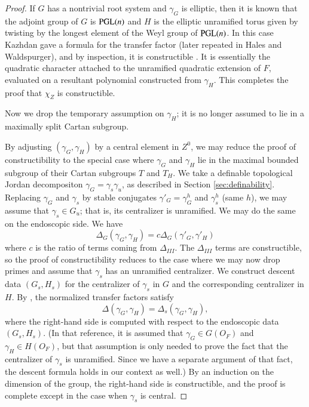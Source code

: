 \begin{proof}

If $G$ has a nontrivial root system and $\gamma_G$ is elliptic, then
it is known that the adjoint group of $G$ is ${\operatorname{PGL}}(n)$ and $H$ is
the elliptic unramified torus given by twisting by the longest element
of the Weyl group of ${\operatorname{PGL}}(n)$.  In this case Kazhdan gave a
formula for the transfer factor (later repeated in Hales and
Waldspurger), and by inspection, it is constructible
\cite{kazhdan1983lifting}.  It is essentially the quadratic character
attached to the unramified quadratic extension of $F$, evaluated on a
resultant polynomial constructed from $\gamma_H$.  This completes the
proof that $\chi_Z$ is constructible.

Now we drop the temporary assumption on $\gamma_H$; it is no longer
assumed to lie in a maximally split Cartan subgroup.

By adjusting $(\gamma_G,\gamma_H)$ by a central element in $Z^0$, we may reduce
the proof of constructibility to the special case where $\gamma_G$ and
$\gamma_H$ lie in the maximal bounded subgroup of their Cartan
subgroups $T$ and $T_H$.  We take a definable topological Jordan
decompositon $\gamma_G = \gamma_s \gamma_u$, as described in Section
\ref{sec:definability}.  Replacing $\gamma_G$ and $\gamma_s$ by stable
conjugates $\gamma'_G=\gamma_G^h$ and $\gamma_s^h$ (same $h$), we may
assume that $\gamma_s\in G_u$; that is, its centralizer is unramified.
We may do the same on the endoscopic side.  We have
\[
\Delta_G(\gamma_G,\gamma_H) = c \Delta_G(\gamma'_G,\gamma'_H)
\]
where $c$ is the ratio of terms coming from $\Delta_{III}$.  The
$\Delta_{III}$ terms are constructible, so the proof of
constructibility reduces to the case where we may now drop primes and
assume that $\gamma_s$ has an unramified centralizer.  We construct
descent data $(G_s,H_s)$ for the centralizer of $\gamma_s$ in $G$ and
the corresponding centralizer in $H$.  By \cite{hales1993simple}, the
normalized transfer factors satisfy
\[
\Delta(\gamma_G,\gamma_H) = \Delta_s(\gamma_G,\gamma_H),
\]
where the right-hand side is computed with respect to the endoscopic
data $(G_s,H_s)$.  (In that reference, it is assumed that $\gamma_G\in
G(O_F)$ and $\gamma_H\in H(O_F)$, but that assumption is only needed
to prove the fact that the centralizer of $\gamma_s$ is unramified.
Since we have a separate argument of that fact, the descent formula
holds in our context as well.)  By an induction on the dimension of
the group, the right-hand side is constructible, and the proof is
complete except in the case when $\gamma_s$ is central.


\end{proof}
